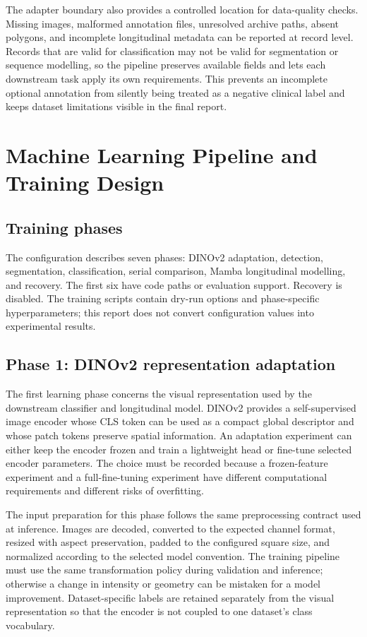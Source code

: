 \documentclass[12pt,a4paper]{article}
\begin{document}
The adapter boundary also provides a controlled location for data-quality checks. Missing images, malformed annotation files, unresolved archive paths, absent polygons, and incomplete longitudinal metadata can be reported at record level. Records that are valid for classification may not be valid for segmentation or sequence modelling, so the pipeline preserves available fields and lets each downstream task apply its own requirements. This prevents an incomplete optional annotation from silently being treated as a negative clinical label and keeps dataset limitations visible in the final report.

\clearpage
\section{Machine Learning Pipeline and Training Design}
\subsection{Training phases}
The configuration describes seven phases: DINOv2 adaptation, detection, segmentation, classification, serial comparison, Mamba longitudinal modelling, and recovery. The first six have code paths or evaluation support. Recovery is disabled. The training scripts contain dry-run options and phase-specific hyperparameters; this report does not convert configuration values into experimental results.

\subsection{Phase 1: DINOv2 representation adaptation}
The first learning phase concerns the visual representation used by the downstream classifier and longitudinal model. DINOv2 provides a self-supervised image encoder whose CLS token can be used as a compact global descriptor and whose patch tokens preserve spatial information. An adaptation experiment can either keep the encoder frozen and train a lightweight head or fine-tune selected encoder parameters. The choice must be recorded because a frozen-feature experiment and a full-fine-tuning experiment have different computational requirements and different risks of overfitting.

The input preparation for this phase follows the same preprocessing contract used at inference. Images are decoded, converted to the expected channel format, resized with aspect preservation, padded to the configured square size, and normalized according to the selected model convention. The training pipeline must use the same transformation policy during validation and inference; otherwise a change in intensity or geometry can be mistaken for a model improvement. Dataset-specific labels are retained separately from the visual representation so that the encoder is not coupled to one dataset's class vocabulary.
\end{document}
